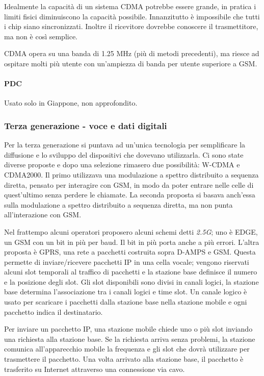 Idealmente la capacità di un sistema CDMA potrebbe essere grande, in pratica i limiti fisici diminuiscono la capacità possibile.
Innanzitutto è impossibile che tutti i chip siano sincronizzati.
Inoltre il ricevitore dovrebbe conoscere il trasmettitore, ma non è così semplice. 

CDMA opera su una banda di 1.25 MHz (più di metodi precedenti), ma riesce ad ospitare molti più utente con un'ampiezza di banda per utente superiore a GSM.

\paragraph{PDC}
Usato solo in Giappone, non approfondito.

\subsubsection{Terza generazione - voce e dati digitali}
Per la terza generazione si puntava ad un'unica tecnologia per semplificare la diffusione e lo sviluppo del dispositivi che dovevano utilizzarla.
Ci sono state diverse proposte e dopo una selezione rimasero due possibilità: W-CDMA e CDMA2000.
Il primo utilizzava una modulazione a spettro distribuito a sequenza diretta, pensato per interagire con GSM, in modo da poter entrare nelle celle di quest'ultimo senza perdere le chiamate.
La seconda proposta si basava anch'essa sulla modulazione a spettro distribuito a sequenza diretta, ma non punta all'interazione con GSM. 

Nel frattempo alcuni operatori proposero alcuni schemi detti \textit{2.5G}; 
uno è EDGE, un GSM con un bit in più per baud. Il bit in più porta anche a più errori.
L'altra proposta è GPRS, una rete a pacchetti costruita sopra D-AMPS e GSM.
Questa permette di inviare/ricevere pacchetti IP in una cella vocale;
vengono riservati alcuni slot temporali al traffico di pacchetti e la stazione base definisce il numero e la posizione degli slot.
Gli slot disponibili sono divisi in canali logici, la stazione base determina l'associazione tra i canali logici e time slot.
Un canale logico è usato per scaricare i pacchetti dalla stazione base nella stazione mobile e ogni pacchetto indica il destinatario.

Per inviare un pacchetto IP, una stazione mobile chiede uno o più slot inviando una richiesta alla stazione base.
Se la richiesta arriva senza problemi, la stazione comunica all'apparecchio mobile la frequenza e gli slot che dovrà utilizzare per trasmettere il pacchetto.
Una volta arrivato alla stazione base, il pacchetto è trasferito su Internet attraverso una connessione via cavo.


